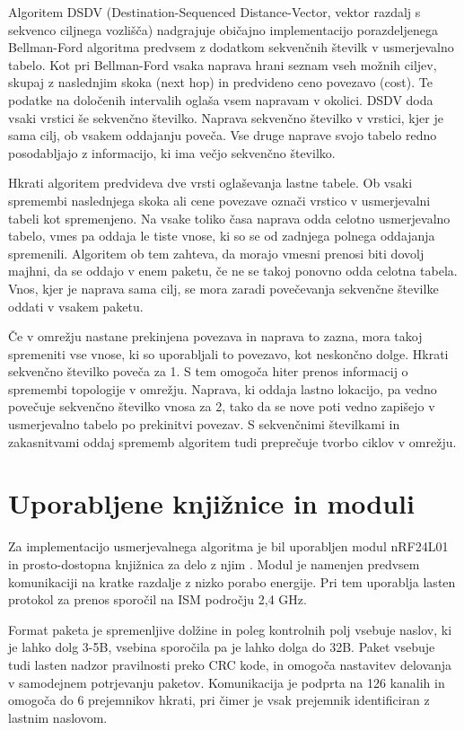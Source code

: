 Algoritem DSDV (Destination-Sequenced Distance-Vector, vektor razdalj s sekvenco ciljnega vozlišča) \cite{perkins1994highly} nadgrajuje običajno implementacijo porazdeljenega Bellman-Ford algoritma predvsem z dodatkom sekvenčnih številk v usmerjevalno tabelo. Kot pri Bellman-Ford vsaka naprava hrani seznam vseh možnih ciljev, skupaj z naslednjim skoka (next hop) in predvideno ceno povezavo (cost). Te podatke na določenih intervalih oglaša vsem napravam v okolici. DSDV doda vsaki vrstici še sekvenčno številko. Naprava sekvenčno številko v vrstici, kjer je sama cilj, ob vsakem oddajanju poveča. Vse druge naprave svojo tabelo redno posodabljajo z informacijo, ki ima večjo sekvenčno številko.

Hkrati algoritem predvideva dve vrsti oglaševanja lastne tabele. Ob vsaki spremembi naslednjega skoka ali cene povezave označi vrstico v usmerjevalni tabeli kot spremenjeno. Na vsake toliko časa naprava odda celotno usmerjevalno tabelo, vmes pa oddaja le tiste vnose, ki so se od zadnjega polnega oddajanja spremenili. Algoritem ob tem zahteva, da morajo vmesni prenosi biti dovolj majhni, da se oddajo v enem paketu, če ne se takoj ponovno odda celotna tabela. Vnos, kjer je naprava sama cilj, se mora zaradi povečevanja sekvenčne številke oddati v vsakem paketu.

Če v omrežju nastane prekinjena povezava in naprava to zazna, mora takoj spremeniti vse vnose, ki so uporabljali to povezavo, kot neskončno dolge. Hkrati sekvenčno številko poveča za 1. S tem omogoča hiter prenos informacij o spremembi topologije v omrežju. Naprava, ki oddaja lastno lokacijo, pa vedno povečuje sekvenčno številko vnosa za 2, tako da se nove poti vedno zapišejo v usmerjevalno tabelo po prekinitvi povezav. S sekvenčnimi številkami in zakasnitvami oddaj sprememb algoritem tudi preprečuje tvorbo ciklov v omrežju.

\section{Uporabljene knjižnice in moduli}
Za implementacijo usmerjevalnega algoritma je bil uporabljen modul nRF24L01 \cite{nRF24L01} in prosto-dostopna knjižnica za delo z njim \cite{nRF24lib}. Modul je namenjen predvsem komunikaciji na kratke razdalje z nizko porabo energije. Pri tem uporablja lasten protokol za prenos sporočil na ISM področju 2,4 GHz.

Format paketa je spremenljive dolžine in poleg kontrolnih polj vsebuje naslov, ki je lahko dolg 3-5B, vsebina sporočila pa je lahko dolga do 32B. Paket vsebuje tudi lasten nadzor pravilnosti preko CRC kode, in omogoča nastavitev delovanja v samodejnem potrjevanju paketov. Komunikacija je podprta na 126 kanalih in omogoča do 6 prejemnikov hkrati, pri čimer je vsak prejemnik identificiran z lastnim naslovom.

